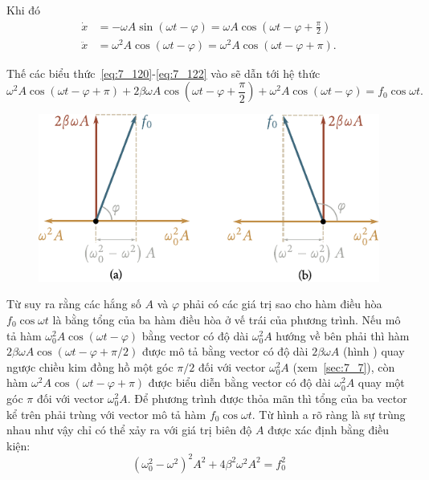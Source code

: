 \noindent
Khi đó
\begin{align}
	\dot{x} &= -\omega A\sin(\omega t - \varphi) = \omega A\cos\left(\omega t - \varphi + \frac{\pi}{2}\right)\label{eq:7_121}\\
	\ddot{x} &= \omega^2 A\cos(\omega t - \varphi) = \omega^2 A\cos(\omega t - \varphi + \pi)\label{eq:7_122}.
\end{align}

\noindent
Thế các biểu thức~\eqref{eq:7_120}-\eqref{eq:7_122} vào  sẽ dẫn tới hệ thức
\begin{equation}\label{eq:7_123}
	\omega^2 A\cos(\omega t - \varphi + \pi) + 2\beta\omega A \cos\left(\omega t - \varphi + \frac{\pi}{2}\right) +
	\omega^2 A\cos(\omega t - \varphi) = f_0\cos\omega t.
\end{equation}

\begin{figure}[t]
	\begin{center}
		\includegraphics[scale=0.95]{figures/ch_07/fig_7_22.pdf}
		\caption[]{}
		\label{fig:7_22}
	\end{center}
	\vspace{-0.8cm}
\end{figure}

Từ  suy ra rằng các hắng số $A$ và $\varphi$ phải có các giá trị sao cho hàm điều hòa $f_0\cos\omega t$ là bằng tổng của ba hàm điều hòa ở vế trái của phương trình. Nếu mô tả hàm $\omega_0^2A\cos(\omega t-\varphi)$ bằng vector có độ dài $\omega_0^2A$ hướng về bên phải thì hàm $2\beta\omega A\cos(\omega t-\varphi+\pi/2)$ được mô tả bằng vector có độ dài $2\beta\omega A$ (hình ) quay ngược chiều kim đồng hồ một góc $\pi/2$ đối với vector $\omega_0^2A$ (xem~\ref{sec:7_7}), còn hàm $\omega^2A\cos(\omega t-\varphi+\pi)$ được biểu diễn bằng vector có độ dài $\omega_0^2A$ quay một góc $\pi$ đối với vector $\omega_0^2A$. Để phương trình  được thỏa mãn thì tổng của ba vector kể trên phải trùng với vector mô tả hàm $f_0\cos\omega t$. Từ hình a rõ ràng là sự trùng nhau như vậy chỉ có thể xảy ra với giá trị biên độ $A$ được xác định bằng điều kiện:
\begin{equation*}
	\left(\omega_0^2 - \omega^2\right)^2A^2 + 4\beta^2\omega^2A^2 = f_0^2
\end{equation*}

